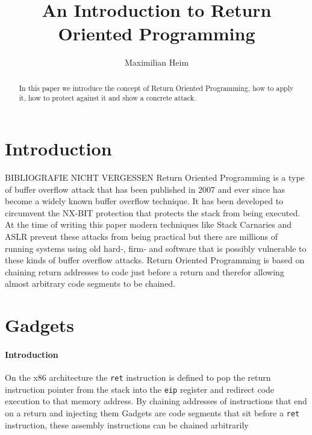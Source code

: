 \documentclass[journal=tosc,submission, notanonymous]{iacrtrans}
\author{Maximilian Heim\inst{1}}
\institute{
  University Albstadt-Sigmaringen, Albstadt, Germany, \email{MaximilianHeim@protonmail.com}
}
\title{An Introduction to Return Oriented Programming}
\begin{document}
\maketitle




\begin{abstract}
  In this paper we introduce the concept of Return Oriented Programming, how to apply it, how to protect against it and show a concrete attack.
\end{abstract}


\section{Introduction}
BIBLIOGRAFIE NICHT VERGESSEN
Return Oriented Programming is a type of buffer overflow attack that has been published in 2007 and ever since has become a widely known buffer overflow technique. It has been developed to circumvent the NX-BIT protection that protects the stack from being executed. At the time of writing this paper modern techniques like Stack Carnaries and ASLR prevent these attacks from being practical but there are millions of running systems using old hard-, firm- and software that is possibly vulnerable to these kinds of buffer overflow attacks. Return Oriented Programming is based on chaining return addresses to code just before a return and therefor allowing almost arbitrary code segments to be chained.


\section{Gadgets}
\label{sec:main}
\paragraph{Introduction}
On the x86 architecture the \Verb+ret+ instruction is defined to pop the return instruction pointer from the stack into the \Verb+eip+ register and redirect code execution to that memory address. By chaining addresses of instructions that end on a return and injecting them 
Gadgets are code segments that sit before a \Verb+ret+ instruction, these assembly instructions can be chained arbitrarily
\end{document}

